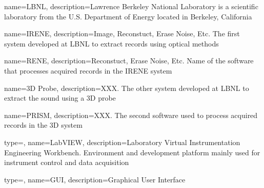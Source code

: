 %

{
    name=LBNL,
    description={Lawrence Berkeley National Laboratory is a scientific laboratory from the U.S. Department of Energy located in Berkeley, California}
}

{
    name=IRENE,
    description={Image, Reconstuct, Erase Noise, Etc. The first system developed at LBNL to extract records using optical methods}
}

{
    name=RENE,
    description={Reconstuct, Erase Noise, Etc. Name of the software that processes acquired records in the IRENE system} %
}

{
    name=3D Probe,
    description={XXX. The other system developed at LBNL to extract the sound using a 3D probe}
}

{
    name=PRISM,
    description={XXX. The second software used to process acquired records in the 3D system}
}

{
    type=\acronymtype,
    name={LabVIEW},
    description={Laboratory Virtual Instrumentation Engineering Workbench. Environment and development platform mainly used for instrument control and data acquisition}
}

{
    type=\acronymtype,
    name={GUI},
    description={Graphical User Interface}
}

